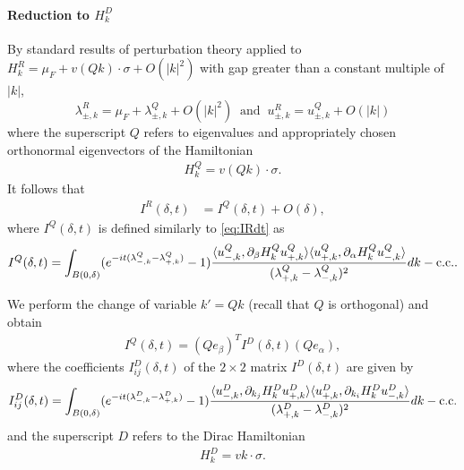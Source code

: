 \documentclass[a4paper,11pt]{article}
\theoremstyle{plain}
\theoremstyle{remark}
\begin{document}
\paragraph{Reduction to $H_k^{D}$}
By standard results of perturbation theory \cite[Chapter XII]{ReedSimon4} applied to
$H_k^{R} = \mu_{F} + v (Q k) \cdot \sigma + O(|k|^{2})
$ with gap greater than a constant multiple of $|k|$,
\[
  \lambda^{R}_{\pm,k} = \mu_F+\lambda^{Q}_{\pm,k} +
  O(|k|^{2})\;\;\mbox{and}\;\;   u^{R}_{\pm,k} = u^{Q}_{\pm,k} + O(|k|)
\]
where the superscript $Q$ refers to eigenvalues and appropriately
chosen orthonormal eigenvectors of the Hamiltonian
\begin{align*}
  H_k^{Q} = v(Qk) \cdot \sigma.
\end{align*}
It follows that
\begin{align*}
  I^{R} (\delta,t) &= I^{Q}(\delta,t) + O(\delta),
\end{align*}
where $I^{Q}(\delta,t)$ is defined similarly to
\eqref{eq:IRdt} as
\begin{align*}
  I^{Q}(\delta,t) = \int_{B(0,\delta)}  (e^{-i t (\lambda^{Q}_{-,k} - \lambda^{Q}_{+,k})} - 1)\frac{\langle u^{Q}_{-,k}, \partial_\beta H_k^{Q} u^{Q}_{+,k} \rangle\langle u^{Q}_{+,k},\partial_\alpha H_k^{Q}u^{Q}_{-,k}\rangle}{(\lambda^{Q}_{+,k} - \lambda^{Q}_{-,k})^{2}}dk - {\rm c.c.}.
\end{align*}


We perform the change of variable $k' = Qk$ (recall that $Q$ is orthogonal) and obtain
\begin{align*}
I^{Q}(\delta,t) = (Qe_\beta)^T I^{D}(\delta,t)(Qe_\alpha),
\end{align*}
where the coefficients $I_{ij}^{D}(\delta,t) $ of the $2\times 2$ matrix  $I^{D}(\delta,t) $ are given by
\begin{align*}
  I_{ij}^{D}(\delta,t) = \int_{B(0,\delta)} (e^{-i t (\lambda^{D}_{-,k} - \lambda^{D}_{+,k})} - 1)\frac{\langle u^{D}_{-,k}, \partial_{k_j} H_k^{D} u^{D}_{+,k} \rangle\langle u^{D}_{+,k},\partial_{k_i} H_k^{D}u^{D}_{-,k}\rangle}{(\lambda^{D}_{+,k} - \lambda^{D}_{-,k})^{2}}dk - {\rm c.c.}
\end{align*}
and the superscript $D$ refers to the Dirac Hamiltonian
\begin{align*}
  H_k^{D} = v k \cdot \sigma.
\end{align*}
\end{document}
